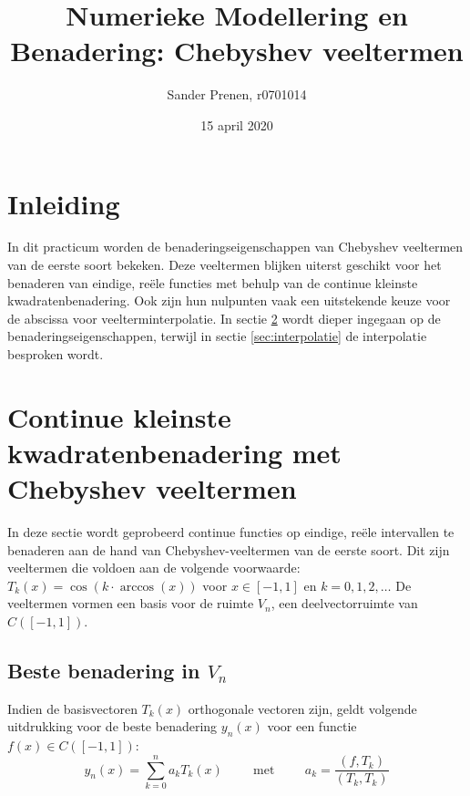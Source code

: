 \documentclass[a4paper, 12pt, titlepage, fleqn]{article}
\begin{document}
\title{\textbf{Numerieke Modellering en Benadering: Chebyshev veeltermen}}
\author{Sander Prenen, r0701014}

\date{15 april 2020}
\begin{titlepage}
	\maketitle
	\thispagestyle{empty}
\end{titlepage}

\newpage
\tableofcontents
\newpage
\section{Inleiding}
In dit practicum worden de benaderingseigenschappen van Chebyshev veeltermen van de eerste soort bekeken. Deze veeltermen blijken uiterst geschikt voor het benaderen van eindige, re\"ele functies met behulp van de continue kleinste kwadratenbenadering. Ook zijn hun nulpunten vaak een uitstekende keuze voor de abscissa voor veelterminterpolatie. In sectie \ref{sec:benadering} wordt dieper ingegaan op de benaderingseigenschappen, terwijl in sectie \ref{sec:interpolatie} de interpolatie besproken wordt.

\section{Continue kleinste kwadratenbenadering met Chebyshev veeltermen}
\label{sec:benadering}
In deze sectie wordt geprobeerd continue functies op eindige, re\"ele intervallen te benaderen aan de hand van Chebyshev-veeltermen van de eerste soort. Dit zijn veeltermen die voldoen aan de volgende voorwaarde: $T_k(x) = \cos(k \cdot \arccos (x))$ voor $x \in [-1,1]$ en $k = 0,1,2,\ldots$ De veeltermen vormen een basis voor de ruimte $V_n$, een deelvectorruimte van $C([-1,1])$. 


\subsection{Beste benadering in $V_n$}
Indien de basisvectoren $T_k(x)$ orthogonale vectoren zijn, geldt volgende uitdrukking voor de beste benadering $y_n(x)$ voor een functie $f(x) \in C([-1,1])$:
\begin{equation}
y_n(x) = \sum_{k=0}^na_kT_k(x) \hspace{1cm} \text{met} \hspace{1cm} a_k = \frac{(f,T_k)}{(T_k,T_k)}
\label{eq:beste_benadering}
\end{equation}
\end{document}
